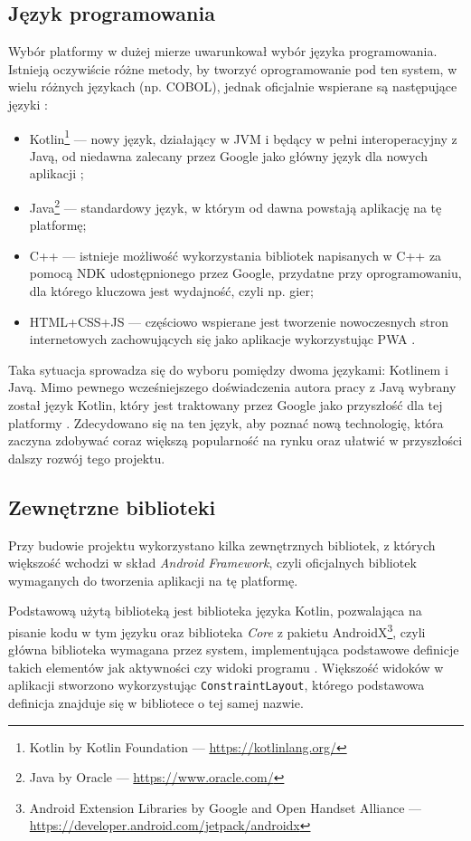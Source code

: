 \documentclass[polish,polish,a4paper,12pt]{article}
\begin{document}
	\subsection{Język programowania}

	Wybór platformy w dużej mierze uwarunkował wybór języka programowania. Istnieją oczywiście różne metody, by tworzyć oprogramowanie pod ten system, w wielu różnych językach (np. COBOL), jednak oficjalnie wspierane są następujące języki \cite{androiddevelopment}:

	\begin{itemize}
		\item Kotlin\footnote{Kotlin by Kotlin Foundation — \url{https://kotlinlang.org/}} — nowy język, działający w JVM i będący w pełni interoperacyjny z Javą, od niedawna zalecany przez Google jako główny język dla nowych aplikacji \cite{kotlinfirst};
		\item Java\footnote{Java by Oracle — \url{https://www.oracle.com/}} — standardowy język, w którym od dawna powstają aplikację na tę platformę;
		\item C++ — istnieje możliwość wykorzystania bibliotek napisanych w C++ za pomocą NDK \cite{ndk} udostępnionego przez Google, przydatne przy oprogramowaniu, dla którego kluczowa jest wydajność, czyli np. gier;
		\item HTML+CSS+JS — częściowo wspierane jest tworzenie nowoczesnych stron internetowych zachowujących się jako aplikacje wykorzystując PWA \cite{pwa}.
	\end{itemize}

	Taka sytuacja sprowadza się do wyboru pomiędzy dwoma językami: Kotlinem i Javą. Mimo pewnego wcześniejszego doświadczenia autora pracy z Javą wybrany został język Kotlin, który jest traktowany przez Google jako przyszłość dla tej platformy \cite{kotlinfirst}. Zdecydowano się na ten język, aby poznać nową technologię, która zaczyna zdobywać coraz większą popularność na rynku oraz ułatwić w przyszłości dalszy rozwój tego projektu.

	\subsection{Zewnętrzne biblioteki}

	Przy budowie projektu wykorzystano kilka zewnętrznych bibliotek, z których większość wchodzi w skład \textit{Android Framework}, czyli oficjalnych bibliotek wymaganych do tworzenia aplikacji na tę platformę.

	Podstawową użytą biblioteką jest biblioteka języka Kotlin, pozwalająca na pisanie kodu w tym języku oraz biblioteka \textit{Core} z pakietu AndroidX\footnote{Android Extension Libraries by Google and Open Handset Alliance — \url{https://developer.android.com/jetpack/androidx}}, czyli główna biblioteka wymagana przez system, implementująca podstawowe definicje takich elementów jak aktywności czy widoki programu \cite{androidapi}. Większość widoków w aplikacji stworzono wykorzystując \texttt{ConstraintLayout}, którego podstawowa definicja znajduje się w bibliotece o tej samej nazwie.
\end{document}
